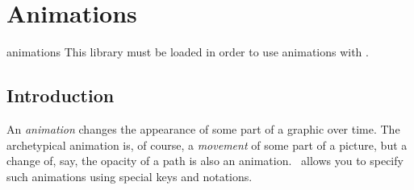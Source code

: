 %
%
%


\section[tikz-animations]{Animations}
\label{section-tikz-animations}

\begin{tikzlibrary}{animations}
    This library must be loaded in order to use animations with \tikzname.
\end{tikzlibrary}


\subsection{Introduction}

An \emph{animation} changes the appearance of some part of a graphic over time.
The archetypical animation is, of course, a \emph{movement} of some part of a
picture, but a change of, say, the opacity of a path is also an animation.
\tikzname\ allows you to specify such animations using special keys and
notations.
%
\begin{codeexample}[imagesource={standalone/pgfmanual-en-tikz-animations-animation-1.svg}]
\end{codeexample}

